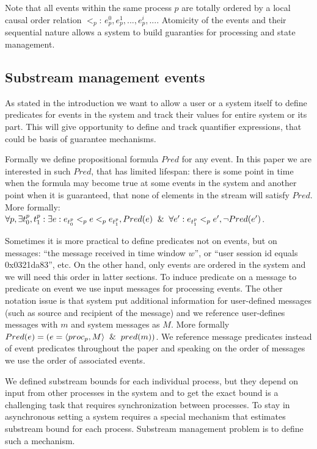 Note that all events within the same process $p$ are totally ordered by a local causal order relation $<_p$: $e^{0}_p,e^{1}_p,...,e^{i}_p,...$. Atomicity of the events and their sequential nature allows a system to build guaranties for processing and state management.

\subsection{Substream management events}
As stated in the introduction we want to allow a user or a system itself to define predicates for events in the system and track their values for entire system or its part. This will give opportunity to define and track quantifier expressions, that could be basis of guarantee mechanisms.

Formally we define propositional formula $Pred$ for any event. In this paper we are interested in such $Pred$, that has limited lifespan: there is some point in time when the formula may become true at some events in the system and another point when it is guaranteed, that none of elements in the stream will satisfy $Pred$. More formally: $\forall p, \exists t_0^p, t_1^p: \exists e: e_{t_0^p} <_p e <_p e_{t_1^p}, Pred(e) \And \forall e': e_{t_1^p} <_p e', \neg Pred(e')$.

Sometimes it is more practical to define predicates not on events, but on messages: ``the message received in time window $w$'', or ``user session id equals 0x0321da83'', etc. On the other hand, only events are ordered in the system and we will need this order in latter sections. To induce predicate on a message to predicate on event we use input messages for processing events. The other notation issue is that system put additional information for user-defined messages (such as source and recipient of the message) and we reference user-defines messages with $m$ and system messages as $M$. More formally $Pred(e) = (e=\langle proc_p, M \rangle \And pred(m))$. We reference message predicates instead of event predicates throughout the paper and speaking on the order of messages we use the order of associated events.

We defined substream bounds for each individual process, but they depend on input from other processes in the system and to get the exact bound is a challenging task that requires synchronization between processes. To stay in asynchronous setting a system requires a special mechanism that estimates substream bound for each process. Substream management problem is to define such a mechanism.

